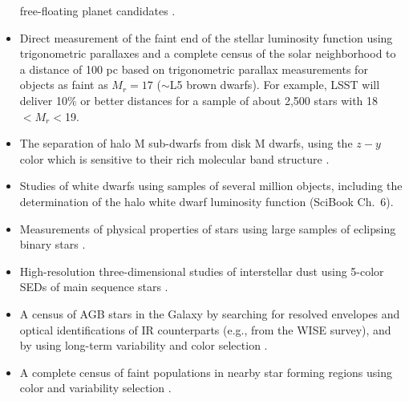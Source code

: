 \begin{itemize}
          free-floating planet candidates \citep{2000MNRAS.314..858L,2014ApJ...786L..18L}.
\item Direct measurement of the faint end of the stellar luminosity function
          using trigonometric parallaxes \citep{2002AJ....124.2721R} and a complete census of the
          solar neighborhood to a distance of 100 pc based on trigonometric parallax measurements for objects as faint as
          $M_r=17$ ($\sim$L5 brown dwarfs). For example, LSST will deliver 10\% or better distances for a sample of about 2,500 stars
          with 18$<M_r<$19. %
\item The separation of halo M sub-dwarfs from disk M dwarfs, using the $z-y$ color which is sensitive to their rich molecular band
          structure \citep{2011ASPC..448..531W,2013AJ....145...40B}.
\item Studies of white dwarfs using samples of several million objects, including the determination of the halo white dwarf luminosity
          function (SciBook Ch.~6).
\item Measurements of physical properties of stars using large samples of eclipsing binary stars \citep{2013AAS...22111601S}.
\item High-resolution three-dimensional studies of interstellar dust using 5-color
          SEDs of main sequence stars \citep{2011A&A...536A..23P,2012ApJ...757..166B,2014ApJ...783..114G}.
\item A census of AGB stars in the Galaxy by searching for resolved envelopes and optical  identifications of IR counterparts
         (e.g., from the WISE survey), and by using long-term variability and color selection \citep{2007ASPC..378..485I}.
\item A complete census of faint populations in nearby star forming regions using
          color and variability selection \citep[e.g.][]{2005AJ....129..907B}.
\end{itemize}


